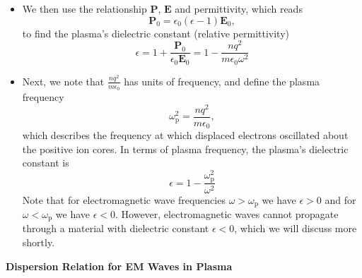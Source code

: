 \documentclass[11pt, a4paper]{article}
\renewcommand{\vec}[1]{\bm{#1}} %
\newcommand{\E}{\vec{E}}  %
\newcommand{\e}{\epsilon}
\newcommand{\ee}{\epsilon_{0}}  %
\renewcommand{\P}{\vec{P}}  %
\begin{document}
\begin{itemize}
	\item We then use the relationship $ \P $, $ \E $ and permittivity, which reads
	\begin{equation*}
		\P_{0} = \ee (\e - 1)\E_{0},
	\end{equation*}
	to find the plasma's dielectric constant (relative permittivity)
	\begin{equation*}
		\e = 1 + \frac{\P_{0}}{\ee \E_{0}} = 1 - \frac{nq^{2}}{m \ee \omega^{2}}
	\end{equation*}
	
	\item Next, we note that $ \frac{nq^{2}}{m \ee} $ has units of frequency, and define the plasma frequency
	\begin{equation*}
		\omega_{\mathrm{p}}^{2} = \frac{nq^{2}}{m \ee},
	\end{equation*}
	which describes the frequency at which displaced electrons oscillated about the positive ion cores. In terms of plasma frequency, the plasma's dielectric constant is
	\begin{equation*}
		\e = 1 - \frac{\omega_{\mathrm{p}}^{2}}{\omega^{2}}
	\end{equation*}
	Note that for electromagnetic wave frequencies $ \omega > \omega_{\mathrm{p}} $ we have $ \e > 0 $ and for $ \omega < \omega_{\mathrm{p}} $ we have $ \e < 0 $. However, electromagnetic waves cannot propagate through a material with dielectric constant $ \e < 0 $, which we will discuss more shortly.
\end{itemize}
\textbf{Dispersion Relation for EM Waves in Plasma}
\end{document}
